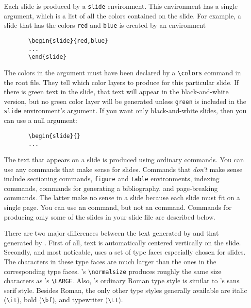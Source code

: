 Each slide is produced by a \xsp{}\mbox{\tt {}slide}\xsp{} environment.  This environment has a single
argument, which is a list of all the colors contained on the slide.
For example, a slide that has the colors \xsp{}\mbox{\tt red}\xsp{}
and \xsp{}\mbox{\tt blue}\xsp{} is created by an environment
\begin{verbatim}
       \begin{slide}{red,blue}
       ...
       \end{slide}
\end{verbatim}
The colors in the argument must have been declared by a
\xsp{}\hbox{\verb"\colors"}\xsp{} command in the root
file.  They tell \SLITEX{} which color layers to produce for this
particular slide.  If there is green text in the slide, that text will
appear in the black-and-white version, but no green color layer will
be generated unless \xsp{}\mbox{\tt green}\xsp{} is included in the
\xsp{}\mbox{\tt slide}\xsp{} environment's argument.  If you want only
black-and-white slides, then you can use a null argument:
\begin{verbatim}
       \begin{slide}{}
       ...
\end{verbatim}

The text that appears on a slide is produced using ordinary \LATEX{}
commands.  You can use any commands that make sense for slides.
Commands that {\it don't\/} make sense include sectioning commands,
\xsp{}\mbox{\tt figure}\xsp{} and \xsp{}\mbox{\tt table}\xsp{}
environments, indexing commands, commands for generating a
bibliography, and page-breaking commands.  The latter make no sense in
a slide because each slide must fit on a single page.  You can use an
\xsp{}\hbox{\verb""}\xsp{} command, but not an
\xsp{}\hbox{\verb""}\xsp{} command.  Commands for producing
only some of the slides in your slide file are described below.

There are two major differences between the text generated by
\SLITEX{} and that generated by \LATEX{}.  First of all, text is
automatically centered vertically on the slide.  Secondly, and most
noticable, \SLITEX{} uses a set of type  faces
especially chosen for slides.  The characters in these type faces are
much larger than the ones in the corresponding \LATEX{} type faces.
\SLITEX's \xsp{}\hbox{\verb"\normalsize"}\xsp{} produces roughly the
same size characters as \LATEX's \xsp{}\hbox{\verb"\LARGE"}\Xsp.
Also, \SLITEX's ordinary Roman type style is similar to \LATEX's sans
serif style.  Besides Roman, the only other type styles generally
available are italic (\hbox{\verb"\it"}), bold (\hbox{\verb"\bf"}),
and typewriter (\hbox{\verb"\tt"}).

